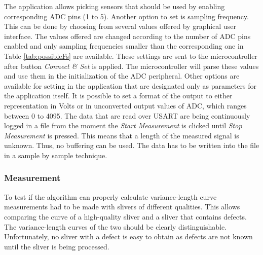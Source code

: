 \documentclass[twoside]{ctuthesis}
\theoremstyle{plain}
\theoremstyle{definition}
\theoremstyle{note}
\begin{document}
The application allows picking sensors that should be used by enabling corresponding ADC pins (1 to 5). Another option to set is sampling frequency. This can be done by choosing from several values offered by graphical user interface. The values offered are changed according to the number of ADC pins enabled and only sampling frequencies smaller than the corresponding one in Table \ref{tab:possibleFs} are available. These settings are sent to the microcontroller after button \textit{Connect \& Set} is applied. The microcontroller will parse these values and use them in the initialization of the ADC peripheral.
Other options are available for setting in the application that are designated only as parameters for the application itself. It is possible to set a format of the output to either representation in Volts or in unconverted output values of ADC, which ranges between 0 to 4095.
The data that are read over USART are being continuously logged in a file from the moment the \textit{Start Measurement} is clicked until \textit{Stop Measurement} is pressed. This means that a length of the measured signal is unknown. Thus, no buffering can be used. The data has to be written into the file in a sample by sample technique. %

\subsubsection{Measurement}
\label{sec:measurement}
To test if the algorithm can properly calculate variance-length curve measurements had to be made with slivers of different qualities. This allows comparing the curve of a high-quality sliver and a sliver that contains defects. The variance-length curves of the two should be clearly distinguishable. Unfortunately, no sliver with a defect is easy to obtain as defects are not known until the sliver is being processed. 
\end{document}
